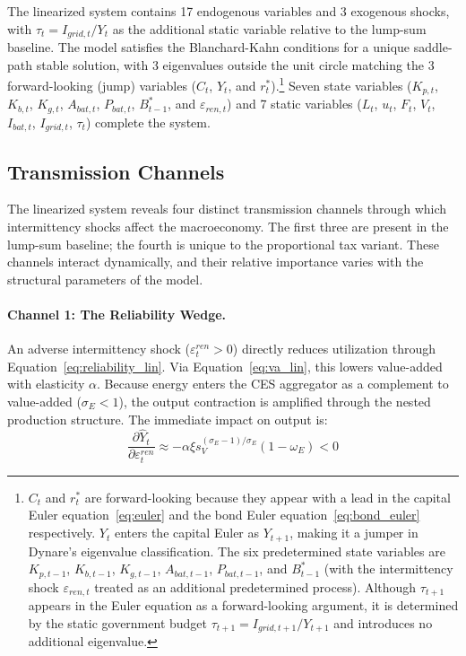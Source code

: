 \documentclass[12pt, a4paper]{article}
\begin{document}
The linearized system contains 17 endogenous variables and 3 exogenous shocks, with $\tau_t = I_{grid,t}/Y_t$ as the additional static variable relative to the lump-sum baseline. The model satisfies the Blanchard-Kahn conditions \citep{blanchard1980} for a unique saddle-path stable solution, with 3 eigenvalues outside the unit circle matching the 3 forward-looking (jump) variables ($C_t$, $Y_t$, and $r^*_t$).\footnote{$C_t$ and $r^*_t$ are forward-looking because they appear with a lead in the capital Euler equation~\eqref{eq:euler} and the bond Euler equation~\eqref{eq:bond_euler} respectively. $Y_t$ enters the capital Euler as $Y_{t+1}$, making it a jumper in Dynare's eigenvalue classification. The six predetermined state variables are $K_{p,t-1}$, $K_{b,t-1}$, $K_{g,t-1}$, $A_{bat,t-1}$, $P_{bat,t-1}$, and $B^*_{t-1}$ (with the intermittency shock $\varepsilon_{ren,t}$ treated as an additional predetermined process). Although $\tau_{t+1}$ appears in the Euler equation as a forward-looking argument, it is determined by the static government budget $\tau_{t+1} = I_{grid,t+1}/Y_{t+1}$ and introduces no additional eigenvalue.} Seven state variables ($K_{p,t}$, $K_{b,t}$, $K_{g,t}$, $A_{bat,t}$, $P_{bat,t}$, $B^*_{t-1}$, and $\varepsilon_{ren,t}$) and 7 static variables ($L_t$, $u_t$, $F_t$, $V_t$, $I_{bat,t}$, $I_{grid,t}$, $\tau_t$) complete the system.

\subsection{Transmission Channels} \label{subsec:transmission}

The linearized system reveals four distinct transmission channels through which intermittency shocks affect the macroeconomy. The first three are present in the lump-sum baseline; the fourth is unique to the proportional tax variant. These channels interact dynamically, and their relative importance varies with the structural parameters of the model.

\paragraph{Channel 1: The Reliability Wedge.}
An adverse intermittency shock ($\varepsilon^{ren}_t > 0$) directly reduces utilization through Equation~\eqref{eq:reliability_lin}. Via Equation~\eqref{eq:va_lin}, this lowers value-added with elasticity $\alpha$. Because energy enters the CES aggregator as a complement to value-added ($\sigma_E < 1$), the output contraction is amplified through the nested production structure. The immediate impact on output is:
\begin{equation}
\frac{\partial \hat{Y}_t}{\partial \varepsilon^{ren}_t} \approx -\alpha \xi s_V^{(\sigma_E-1)/\sigma_E}(1-\omega_E) < 0
\end{equation}
\end{document}
